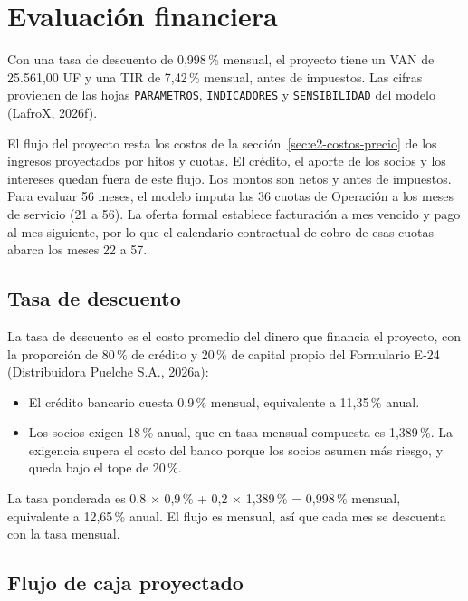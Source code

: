 \section{Evaluación financiera}
\label{sec:e2-evaluacion}

Con una tasa de descuento de 0,998\,\% mensual, el proyecto tiene un VAN de 25.561,00 UF y una TIR de 7,42\,\% mensual, antes de impuestos. Las cifras provienen de las hojas \texttt{PARAMETROS}, \texttt{INDICADORES} y \texttt{SENSIBILIDAD} del modelo (LafroX, 2026f).

El flujo del proyecto resta los costos de la sección~\ref{sec:e2-costos-precio} de los ingresos proyectados por hitos y cuotas. El crédito, el aporte de los socios y los intereses quedan fuera de este flujo. Los montos son netos y antes de impuestos. Para evaluar 56 meses, el modelo imputa las 36 cuotas de Operación a los meses de servicio (21 a 56). La oferta formal establece facturación a mes vencido y pago al mes siguiente, por lo que el calendario contractual de cobro de esas cuotas abarca los meses 22 a 57.

\subsection{Tasa de descuento}
\label{sec:e2-tasa-descuento}

La tasa de descuento es el costo promedio del dinero que financia el proyecto, con la proporción de 80\,\% de crédito y 20\,\% de capital propio del Formulario E-24 (Distribuidora Puelche S.A., 2026a):
\begin{itemize}
  \item El crédito bancario cuesta 0,9\,\% mensual, equivalente a 11,35\,\% anual.
  \item Los socios exigen 18\,\% anual, que en tasa mensual compuesta es 1,389\,\%. La exigencia supera el costo del banco porque los socios asumen más riesgo, y queda bajo el tope de 20\,\%.
\end{itemize}

La tasa ponderada es 0,8 × 0,9\,\% + 0,2 × 1,389\,\% = 0,998\,\% mensual, equivalente a 12,65\,\% anual. El flujo es mensual, así que cada mes se descuenta con la tasa mensual.

\subsection{Flujo de caja proyectado}
\label{sec:e2-flujo-proyectado}

